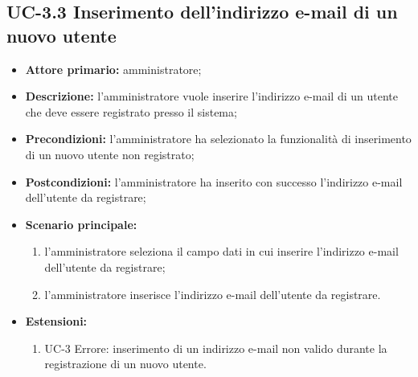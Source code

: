 \subsection{UC-3.3 Inserimento dell'indirizzo e-mail di un nuovo utente}
\begin{itemize}
	\item \textbf{Attore primario:} amministratore;

	\item \textbf{Descrizione:} l'amministratore vuole inserire l'indirizzo e-mail di un utente che deve essere registrato presso il sistema;

	\item \textbf{Precondizioni:} l'amministratore ha selezionato la funzionalità di inserimento di un nuovo utente non registrato;

	\item \textbf{Postcondizioni:} l'amministratore ha inserito con successo l'indirizzo e-mail dell'utente da registrare;

	\item \textbf{Scenario principale:}
	      \begin{enumerate}
		      \item l'amministratore seleziona il campo dati in cui inserire l'indirizzo e-mail dell'utente da registrare;
		      \item l'amministratore inserisce l'indirizzo e-mail dell'utente da registrare.
	      \end{enumerate}

	\item \textbf{Estensioni:}
	      \begin{enumerate}
		      \item UC-3 Errore: inserimento di un indirizzo e-mail non valido durante la registrazione di un nuovo utente.
	      \end{enumerate}
\end{itemize}


